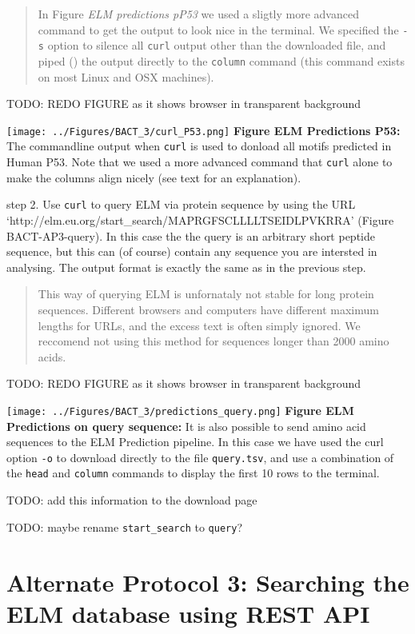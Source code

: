 \begin{quote}
In Figure \emph{ELM predictions pP53} we used a sligtly more advanced
command to get the output to look nice in the terminal. We specified the
\texttt{-s} option to silence all \texttt{curl} output other than the
downloaded file, and piped (\texttt{\textbar{}}) the output directly to
the \texttt{column} command (this command exists on most Linux and OSX
machines).
\end{quote}

TODO: REDO FIGURE as it shows browser in transparent background

\texttt{[image: ../Figures/BACT\_3/curl\_P53.png]} \textbf{Figure ELM
Predictions P53:} The commandline output when \texttt{curl} is used to
donload all motifs predicted in Human P53. Note that we used a more
advanced command that \texttt{curl} alone to make the columns align
nicely (see text for an explanation).

step 2. Use \texttt{curl} to query ELM via protein sequence by using the
URL `http://elm.eu.org/start\_search/MAPRGFSCLLLLTSEIDLPVKRRA' (Figure
BACT-AP3-query). In this case the the query is an arbitrary short
peptide sequence, but this can (of course) contain any sequence you are
intersted in analysing. The output format is exactly the same as in the
previous step.

\begin{quote}
This way of querying ELM is unfornataly not stable for long protein
sequences. Different browsers and computers have different maximum
lengths for URLs, and the excess text is often simply ignored. We
reccomend not using this method for sequences longer than 2000 amino
acids.
\end{quote}

TODO: REDO FIGURE as it shows browser in transparent background

\texttt{[image: ../Figures/BACT\_3/predictions\_query.png]} \textbf{Figure
ELM Predictions on query sequence:} It is also possible to send amino
acid sequences to the ELM Prediction pipeline. In this case we have used
the curl option \texttt{-o} to download directly to the file
\texttt{query.tsv}, and use a combination of the \texttt{head} and
\texttt{column} commands to display the first 10 rows to the terminal.

TODO: add this information to the download page

TODO: maybe rename \texttt{start\_search} to \texttt{query}?

\section{Alternate Protocol 3: Searching the ELM database using REST
API}\label{alternate-protocol-3-searching-the-elm-database-using-rest-api}

